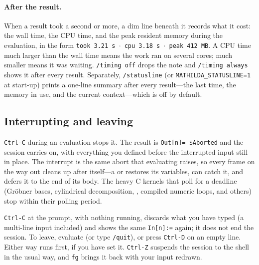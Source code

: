 \paragraph{After the result.} When a result took a second or
more, a dim line beneath it records what it cost: the wall time, the CPU time, and
the peak resident memory during the evaluation, in the form
\texttt{took 3.21 s \(\cdot\) cpu 3.18 s \(\cdot\) peak 412 MB}. A CPU time much larger
than the wall time means the work ran on several cores; much smaller means it was
waiting. \texttt{/timing off} drops the note and \texttt{/timing always} shows it
after every result. Separately, \texttt{/statusline} (or \texttt{MATHILDA\_STATUSLINE=1}
at start-up) prints a one-line summary after every result---the last time, the
memory in use, and the current context---which is off by default.

\subsection{Interrupting and leaving}
\label{sec:leaving}

\texttt{Ctrl-C} during an evaluation stops it. The result is
\texttt{Out[n]= \$Aborted} and the session carries on, with everything you defined
before the interrupted input still in place. The interrupt is the same abort that
evaluating  raises, so every frame on the way out cleans up after
itself---a  or  restores its variables,  can
catch it, and  defers it to the end of its body. The heavy C
kernels that poll for a deadline (Gr\"obner bases, cylindrical decomposition,
, compiled numeric loops, and others) stop within their polling
period.%

\texttt{Ctrl-C} at the prompt, with nothing running, discards what you have typed
(a multi-line input included) and shows the same \texttt{In[n]:=} again; it does
not end the session. To leave, evaluate  (or type
\texttt{/quit}), or press \texttt{Ctrl-D} on an empty line. Either way
 runs first, if you have set it. \texttt{Ctrl-Z} suspends the session
to the shell in the usual way, and \texttt{fg} brings it back with your input
redrawn.

